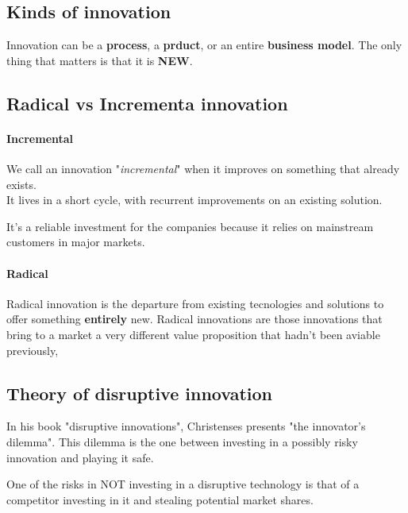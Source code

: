 \documentclass{article}
\begin{document}
\subsection{Kinds of innovation}
Innovation can be a \textbf{process}, a \textbf{prduct}, or an entire \textbf{business model}. 
The only thing that matters is that it is \textbf{NEW}.

\subsection{Radical vs Incrementa innovation}
\paragraph{Incremental}
We call an innovation "\textit{incremental}" when it improves on something that already exists. \\
It lives in a short cycle, with recurrent improvements on an existing solution.

It's a reliable investment for the companies because it relies on mainstream customers in major markets.

\paragraph{Radical}
Radical innovation is the departure from existing tecnologies and solutions to offer something \textbf{entirely} new.
Radical innovations are those innovations that bring to a market a very different value proposition that hadn't been aviable previously,

\subsection{Theory of disruptive innovation}
In his book "disruptive innovations", Christenses presents "the innovator's \\ dilemma". This dilemma is the one between investing in a possibly risky innovation and playing it safe.

One of the risks in NOT investing in a disruptive technology is that of a competitor investing in it and stealing potential market shares.
\end{document}
